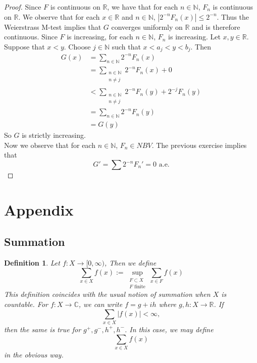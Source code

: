 \documentclass[12pt]{amsart}
\newtheorem{defn}[thm]{Definition}
\newcommand{\C}{\mathbb{C}}
\newcommand{\N}{\mathbb{N}}
\newcommand{\R}{\mathbb{R}}
\newcommand{\Rg}{[0,\infty)}
\begin{document}
\begin{proof}
Since $F$ is continuous on $\R$, we have that for each $n \in \N$, $F_n$ is continuous on $\R$. We observe that for each $x \in \R$ and $n \in \N$, $|2^{-n}F_n(x)| \leq 2^{-n}$. Thus the Weierstrass M-test implies that $G$ converges uniformly on $\R$ and is therefore continuous. Since $F$ is increasing, for each $n \in \N$, $F_n$ is increasing. Let $x, y \in \R$. Suppose that $x<y$. Choose $j \in \N$ such that $x<a_j<y<b_j$. Then 
\begin{align*}
G(x) 
&= \sum_{n \in \N}2^{-n}F_n(x)\\
&= \sum_{\substack{n \in \N \\ n \neq j}}2^{-n}F_n(x) + 0\\
& < \sum_{\substack{n \in \N \\ n \neq j}}2^{-n}F_n(y) + 2^{-j}F_n(y)\\
&=\sum_{n \in \N}2^{-n}F_n(y)\\
&=G(y)
\end{align*}
So $G$ is strictly increasing.\\
Now we observe that for each $n \in \N$, $F_n \in NBV$. The previous exercise implies that $$G' = \sum 2^{-n}F_n'=0 \text{ a.e.}$$
\end{proof}




\section{Appendix}

\subsection{Summation}

\begin{defn}
Let $f:X \rightarrow \Rg$, Then we define $$\sum_{x \in X} f(x) := \sup_{\substack{F \subset X \\ F \text{ finite}}} \sum_{x \in F} f(x)$$ This definition coincides with the usual notion of summation when $X$ is countable. For $f:X \rightarrow \C$, we can write $f = g +ih$ where $g,h:X \rightarrow \R$. If $$\sum_{x \in X}|f(x)| < \infty,$$ then the same is true for $g^+,g^-,h^+,h^-$. In this case, we may define $$\sum_{x \in X} f(x)$$ in the obvious way.
\end{defn}
\end{document}
